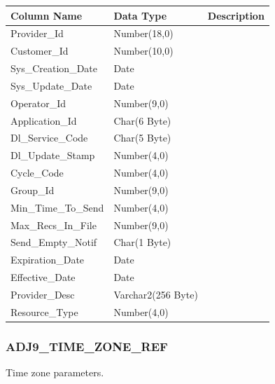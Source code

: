 \documentclass[12pt,twoside]{article}
\begin{document}
\begin{center}
\begin{tabular}{lll}
\hline
\textbf{Column Name} & \textbf{Data Type} & \textbf{Description}\\
\hline
Provider\_Id & Number(18,0) & \\
Customer\_Id & Number(10,0) & \\
Sys\_Creation\_Date & Date & \\
Sys\_Update\_Date & Date & \\
Operator\_Id & Number(9,0) & \\
Application\_Id & Char(6 Byte) & \\
Dl\_Service\_Code & Char(5 Byte) & \\
Dl\_Update\_Stamp & Number(4,0) & \\
Cycle\_Code & Number(4,0) & \\
Group\_Id & Number(9,0) & \\
Min\_Time\_To\_Send & Number(4,0) & \\
Max\_Recs\_In\_File & Number(9,0) & \\
Send\_Empty\_Notif & Char(1 Byte) & \\
Expiration\_Date & Date & \\
Effective\_Date & Date & \\
Provider\_Desc & Varchar2(256 Byte) & \\
Resource\_Type & Number(4,0) & \\
\hline
\end{tabular}
\end{center}

\normalsize

\subsubsection{ADJ9\_TIME\_ZONE\_REF}
\label{sec:orgheadline39}
Time zone parameters.
\end{document}

